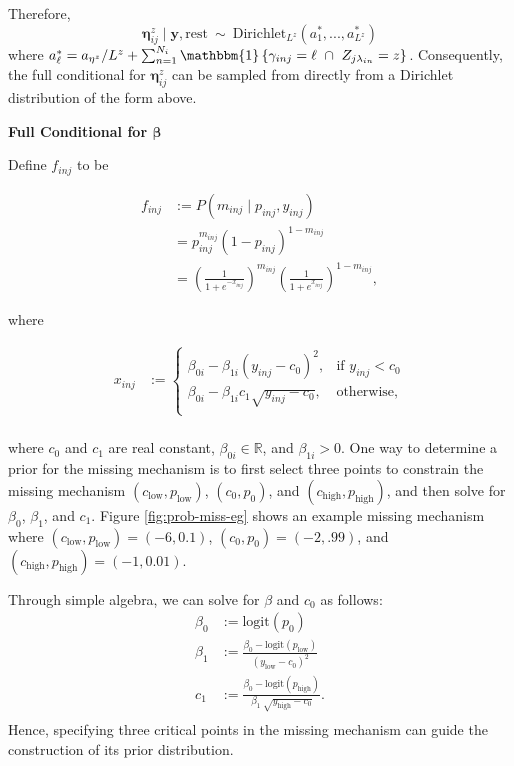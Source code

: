 \documentclass[12pt,]{article}
\newcommand{\p}[1]{\left(#1\right)}
\newcommand{\bc}[1]{ \left\{#1\right\} }
\def\beginmyfig{\begin{figure}[H]\center}
\def\endmyfig{\end{figure}}
\def\logit{\text{logit}}
\def\Dir{\text{Dirichlet}}
\def\lin{\lambda_{in}}
\def\y{\bm{y}}
\newcommand{\Ind}[1]{\mathbbm{1}\bc{#1}}
\def\rest{\text{rest}}
\def\beginmyfig{\begin{figure}[H]\center}
\def\endmyfig{\end{figure}}
\begin{document}
Therefore, \[
\bm{\eta}^z_{ij} \mid \y,\rest ~\sim~ \Dir_{L^z}\p{a^*_1,...,a^*_{L^z}}
\] where
\(a^*_\ell = a_{\eta^z}/L^z+\sum_{n=1}^{N_i}\Ind{\gamma_{inj}=\ell ~\cap~ Z_{j\lin}=z}\).
Consequently, the full conditional for \(\bm{\eta}^z_{ij}\) can be
sampled from directly from a Dirichlet distribution of the form above.
\vspace{2em}


\textbf{Full Conditional for $\bm\beta$}

Define \(f_{inj}\) to be

\begin{align*}
f_{inj} &:= P(m_{inj} \mid p_{inj}, y_{inj}) \\
&= p_{inj}^{m_{inj}} (1-p_{inj})^{1 - m_{inj}} \\
&= \left(\frac{1}{1+e^{-x_{inj}}} \right)^{m_{inj}}\left(\frac{1}{1+e^{x_{inj}}} \right)^{1-m_{inj}},
\end{align*}

where

\begin{align*}
  x_{inj} &:= \begin{cases}
  \beta_{0i} - \beta_{1i}(y_{inj}-c_0)^2, & \text{if } y_{inj} < c_0\nonumber \\
  \beta_{0i} - \beta_{1i}c_1\sqrt{y_{inj}-c_0}, & \text{otherwise}, \nonumber \\
  \end{cases}\\
\end{align*}

where \(c_0\) and \(c_1\) are real constant, $\beta_{0i} \in \mathbb{R}$, and
$\beta_{1i} > 0$.
One way to determine a prior for the missing mechanism is to first select three
points to constrain the missing mechanism $(c_\text{low}, p_\text{low})$,
$(c_0, p_0)$, and $(c_\text{high}, p_\text{high})$, and then 
solve for $\beta_0$, $\beta_1$, and $c_1$. Figure \ref{fig:prob-miss-eg} shows
an example missing mechanism where $(c_\text{low}, p_\text{low}) = (-6,0.1)$,
$(c_0, p_0)=(-2,.99)$, and $(c_\text{high}, p_\text{high}) = (-1,0.01)$.

Through simple algebra, we can solve for $\beta$ and $c_0$ as follows:
\begin{align*}
  \beta_0 &:= \logit(p_0) \\
  \beta_1 &:= \frac{\beta_0 - \logit(p_\text{low})}{(y_\text{low} - c_0)^2} \\
  c_1 &:= \frac{\beta_0 - \logit(p_\text{high})}{\beta_1 ~ \sqrt{y_\text{high} - c_0} }. \\
\end{align*}
Hence, specifying three critical points in the missing mechanism can guide
the construction of its prior distribution.
\vspace{2em}
\end{document}
